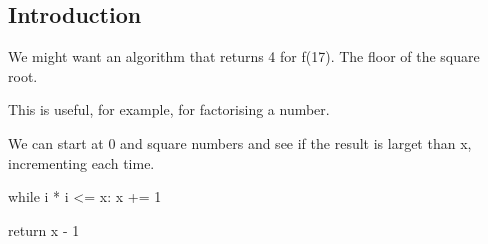 
\subsection{Introduction}


We might want an algorithm that returns 4 for f(17). The floor of the square root.

This is useful, for example, for factorising a number.

We can start at 0 and square numbers and see if the result is larget than x, incrementing each time.

while i * i <= x:
    x += 1
    
return x - 1


